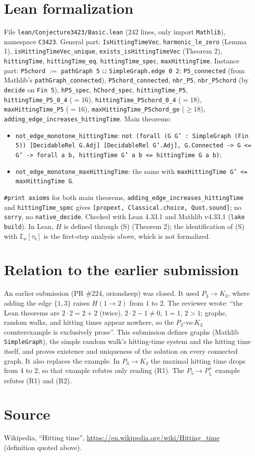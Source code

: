 \documentclass[11pt]{article}
\theoremstyle{definition}
\begin{document}
\section{Lean formalization}
File \texttt{lean/Conjecture3423/Basic.lean} (242 lines, only import \texttt{Mathlib}), namespace
\texttt{C3423}. General part: \texttt{IsHittingTimeVec}, \texttt{harmonic\_le\_zero} (Lemma 1),
\texttt{isHittingTimeVec\_unique}, \texttt{exists\_isHittingTimeVec} (Theorem 2),
\texttt{hittingTime}, \texttt{hittingTime\_eq}, \texttt{hittingTime\_spec}, \texttt{maxHittingTime}.
Instance part: \texttt{P5chord} $:=$ \texttt{pathGraph 5} $\sqcup$ \texttt{SimpleGraph.edge 0 2};
\texttt{P5\_connected} (from Mathlib's \texttt{pathGraph\_connected}), \texttt{P5chord\_connected},
\texttt{nbr\_P5}, \texttt{nbr\_P5chord} (by \texttt{decide} on \texttt{Fin 5}), \texttt{hP5\_spec},
\texttt{hChord\_spec}, \texttt{hittingTime\_P5}, \texttt{hittingTime\_P5\_0\_4} ($=16$),
\texttt{hittingTime\_P5chord\_0\_4} ($=18$), \texttt{maxHittingTime\_P5} ($=16$),
\texttt{maxHittingTime\_P5chord\_ge} ($\ge18$), \texttt{adding\_edge\_increases\_hittingTime}.
Main theorems:
\begin{itemize}
\item \texttt{not\_edge\_monotone\_hittingTime}: \texttt{not (forall (G G' : SimpleGraph (Fin 5))
  [DecidableRel G.Adj] [DecidableRel G'.Adj], G.Connected -> G <= G' -> forall a b,
  hittingTime G' a b <= hittingTime G a b)};
\item \texttt{not\_edge\_monotone\_maxHittingTime}: the same with \texttt{maxHittingTime G' <=
  maxHittingTime G}.
\end{itemize}
\texttt{\#print axioms} for both main theorems, \texttt{adding\_edge\_increases\_hittingTime} and
\texttt{hittingTime\_spec} gives \texttt{[propext, Classical.choice, Quot.sound]}; no
\texttt{sorry}, no \texttt{native\_decide}. Checked with Lean 4.33.1 and Mathlib v4.33.1
(\texttt{lake build}). In Lean, $H$ is defined through (S) (Theorem 2); the identification of (S)
with $\mathbb E_a[\tau_b]$ is the first-step analysis above, which is not formalized.

\section{Relation to the earlier submission}
An earlier submission (PR \#224, orionsheep) was closed. It used $P_3\to K_3$, where adding the edge
$\{1,3\}$ raises $H(1\to2)$ from $1$ to $2$. The reviewer wrote: ``the Lean theorems are
$2\cdot2 = 2+2$ (twice), $2\cdot2-1\ne0$, $1 = 1$, $2 > 1$; graphs, random walks, and hitting times
appear nowhere, so the $P_3$-vs-$K_3$ counterexample is exclusively prose''. This submission
defines graphs (Mathlib \texttt{SimpleGraph}), the simple random walk's hitting-time system and
the hitting time itself, and proves existence and uniqueness of the solution on every connected
graph. It also replaces the example. In $P_3\to K_3$ the maximal hitting time drops from $4$ to
$2$, so that example refutes only reading (R1). The $P_5\to P_5^+$ example refutes (R1) and (R2).

\section*{Source}
Wikipedia, ``Hitting time'', \url{https://en.wikipedia.org/wiki/Hitting_time} (definition quoted
above).
\end{document}
